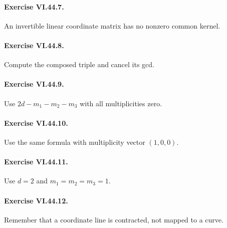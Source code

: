 \paragraph{Exercise VI.44.7.}
\begin{hint}
An invertible linear coordinate matrix has no nonzero common kernel.
\end{hint}

\paragraph{Exercise VI.44.8.}
\begin{hint}
Compute the composed triple and cancel its gcd.
\end{hint}

\paragraph{Exercise VI.44.9.}
\begin{hint}
Use \(2d-m_1-m_2-m_3\) with all multiplicities zero.
\end{hint}

\paragraph{Exercise VI.44.10.}
\begin{hint}
Use the same formula with multiplicity vector \((1,0,0)\).
\end{hint}

\paragraph{Exercise VI.44.11.}
\begin{hint}
Use \(d=2\) and \(m_1=m_2=m_3=1\).
\end{hint}

\paragraph{Exercise VI.44.12.}
\begin{hint}
Remember that a coordinate line is contracted, not mapped to a curve.
\end{hint}

